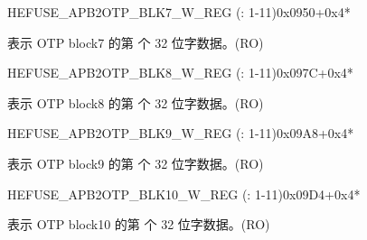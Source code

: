 \begin{register}{H}{EFUSE\_APB2OTP\_BLK7\_W\_REG (: 1-11)}{0x0950+0x4*}\label{regdesc:EFUSEAPB2OTPBLK7WNREG}
%
\regnewline%
\begin{regdesc}\begin{reglist}
\label{fielddesc:EFUSEAPB2OTPBLOCK7WN}\item [EFUSE\_APB2OTP\_BLOCK7\_W\regindex{n}] 表示 OTP block7 的第  个 32 位字数据。(RO)
\end{reglist}\end{regdesc}
\end{register}

\begin{register}{H}{EFUSE\_APB2OTP\_BLK8\_W\_REG (: 1-11)}{0x097C+0x4*}\label{regdesc:EFUSEAPB2OTPBLK8WNREG}
%
\regnewline%
\begin{regdesc}\begin{reglist}
\label{fielddesc:EFUSEAPB2OTPBLOCK8WN}\item [EFUSE\_APB2OTP\_BLOCK8\_W\regindex{n}] 表示 OTP block8 的第  个 32 位字数据。(RO)
\end{reglist}\end{regdesc}
\end{register}

\begin{register}{H}{EFUSE\_APB2OTP\_BLK9\_W\_REG (: 1-11)}{0x09A8+0x4*}\label{regdesc:EFUSEAPB2OTPBLK9WNREG}
%
\regnewline%
\begin{regdesc}\begin{reglist}
\label{fielddesc:EFUSEAPB2OTPBLOCK9WN}\item [EFUSE\_APB2OTP\_BLOCK9\_W\regindex{n}] 表示 OTP block9 的第  个 32 位字数据。(RO)
\end{reglist}\end{regdesc}
\end{register}

\begin{register}{H}{EFUSE\_APB2OTP\_BLK10\_W\_REG (: 1-11)}{0x09D4+0x4*}\label{regdesc:EFUSEAPB2OTPBLK10WNREG}
%
\regnewline%
\begin{regdesc}\begin{reglist}
\label{fielddesc:EFUSEAPB2OTPBLOCK10WN}\item [EFUSE\_APB2OTP\_BLOCK10\_W\regindex{n}] 表示 OTP block10 的第  个 32 位字数据。(RO)
\end{reglist}\end{regdesc}
\end{register}

